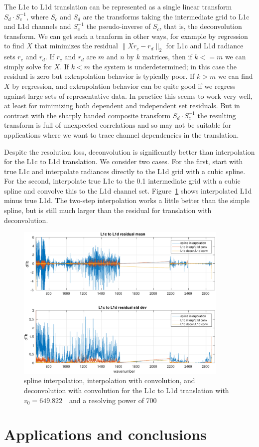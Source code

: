 \documentclass[11pt]{article}
\begin{document}
The L1c to L1d translation can be represented as a single linear
transform $S_d\cdot S_c^{-1}$, where $S_c$ and $S_d$ are the
transforms taking the intermediate grid to L1c and L1d channels and
$S_c^{-1}$ the pseudo-inverse of $S_c$, that is, the deconvolution
transform.  We can get such a tranform in other ways, for example by
regression to find $X$ that minimizes the residual $\|X r_c -
r_d\|_2$ for L1c and L1d radiance sets $r_c$ and $r_d$.  If $r_c$ and
$r_d$ are $m$ and $n$ by $k$ matrices, then if $k <= m$ we can simply
solve for $X$.  If $k < m$ the system is underdetermined; in this
case the residual is zero but extrapolation behavior is typically
poor.  If $k > m$ we can find $X$ by regression, and extrapolation
behavior can be quite good if we regress against large sets of
representative data.  In practice this seems to work very well, at
least for minimizing both dependent and independent set residuals.
But in contrast with the sharply banded composite transform $S_d\cdot
S_c^{-1}$ the resulting transform is full of unexpected correlations
and so may not be suitable for applications where we want to trace
channel dependencies in the translation.

Despite the resolution loss, deconvolution is significantly better
than interpolation for the L1c to L1d translation.  We consider two
cases.  For the first, start with true L1c and interpolate radiances
directly to the L1d grid with a cubic spline.  For the second,
interpolate true L1c to the 0.1 {\wn} intermediate grid with a cubic
spline and convolve this to the L1d channel set.
Figure~\ref{interpL1d} shows interpolated L1d minus true L1d.  The
two-step interpolation works a little better than the simple spline,
but is still much larger than the residual for translation with
deconvolution.

\begin{figure} %
  \centering
  \includegraphics[height=7.5cm]{figures/CtoD_interp_diff.pdf}
  \caption{spline interpolation, interpolation with convolution, 
    and deconvolution with convolution for the {\airs} L1c to L1d
    translation with $v_0=649.822$~\wn\ and a resolving power of 700}
  \label{interpL1d}
\end{figure}

\FloatBarrier
\section{Applications and conclusions}
\label{appcon}

\FloatBarrier


\end{document}
